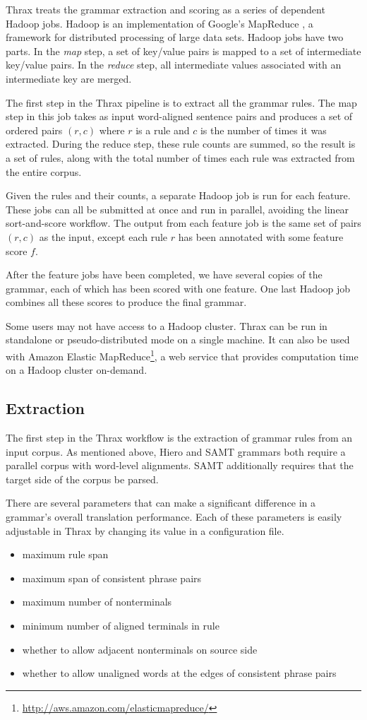 \documentclass[11pt]{article}
\begin{document}
Thrax treats the grammar extraction and scoring as a series of dependent Hadoop jobs. Hadoop is an implementation of Google's MapReduce \cite{mapreduce}, a framework for distributed processing of large data sets. Hadoop jobs have two parts. In the {\em map} step, a set of key/value pairs is mapped to a set of intermediate key/value pairs. In the {\em reduce} step, all intermediate values associated with an intermediate key are merged.

The first step in the Thrax pipeline is to extract all the grammar rules. The map step in this job takes as input word-aligned sentence pairs and produces a set of ordered pairs $(r,c)$ where $r$ is a rule and $c$ is the number of times it was extracted. During the reduce step, these rule counts are summed, so the result is a set of rules, along with the total number of times each rule was extracted from the entire corpus.

Given the rules and their counts, a separate Hadoop job is run for each feature. These jobs can all be submitted at once and run in parallel, avoiding the linear sort-and-score workflow. The output from each feature job is the same set of pairs $(r,c)$ as the input, except each rule $r$ has been annotated with some feature score $f$.

After the feature jobs have been completed, we have several copies of the grammar, each of which has been scored with one feature. One last Hadoop job combines all these scores to produce the final grammar.

Some users may not have access to a Hadoop cluster. Thrax can be run in standalone or pseudo-distributed mode on a single machine. It can also be used with Amazon Elastic MapReduce\footnote{\url{http://aws.amazon.com/elasticmapreduce/}}, a web service that provides computation time on a Hadoop cluster on-demand.

\subsection{Extraction}

The first step in the Thrax workflow is the extraction of grammar rules from an input corpus. As mentioned above, Hiero and SAMT grammars both require a parallel corpus with word-level alignments. SAMT additionally requires that the target side of the corpus be parsed.

There are several parameters that can make a significant difference in a grammar's overall translation performance. Each of these parameters is easily adjustable in Thrax by changing its value in a configuration file.
\begin{itemize}
\item maximum rule span
\item maximum span of consistent phrase pairs
\item maximum number of nonterminals
\item minimum number of aligned terminals in rule
\item whether to allow adjacent nonterminals on source side
\item whether to allow unaligned words at the edges of consistent phrase pairs
\end{itemize}
\end{document}
